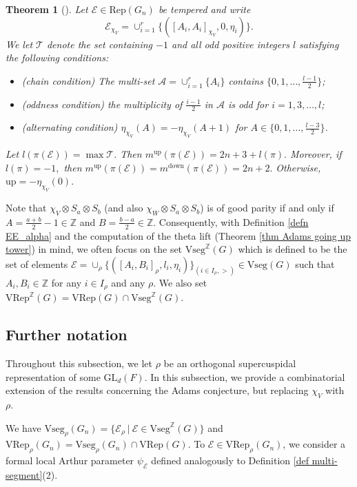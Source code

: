 \documentclass[11pt,letterpaper]{amsart}
\newcommand{\Z}{\mathbb{Z}}
\newcommand{\Vseg}{{\mathrm{Vseg}}}
\newcommand{\Rep}{{\mathrm{Rep}}}
\newcommand{\VRep}{{\mathrm{VRep}}}
\newcommand{\up}{{\mathrm{up}}}
\newcommand{\down}{{\mathrm{down}}}
\newcommand{\GL}{\mathrm{GL}}
\newcommand{\EE}{\mathcal{E}}
\newtheorem{thm}{Theorem}[section]
\numberwithin{equation}{section}
\begin{document}
\begin{thm}[{\cite[Theorem 4.1]{AG17a}}]\label{thm going up first occurrence}
    Let $\EE\in\Rep(G_n)$ be tempered and write
    \[
    \EE_{\chi_V}=\cup_{i=1}^r\{([A_i,A_i]_{\chi_V},0,\eta_i)\}.
    \]
    We let $\mathcal{T}$ denote the set containing $-1$ and all odd positive integers $l$ satisfying the following conditions:
    \begin{itemize}
        \item (chain condition) The multi-set $\mathcal{A}=\cup_{i=1}^r\{A_i\}$ contains $\{0,1,\dots,\frac{l-1}{2}\}$;
        \item (oddness condition) the multiplicity of $\frac{i-1}{2}$ in $\mathcal{A}$ is odd for $i=1,3,\dots,l$;
        \item (alternating condition) $\eta_{\chi_V}(A)=-\eta_{\chi_V}(A+1)$ for $A\in\{0,1,\dots,\frac{l-3}{2}\}$.
    \end{itemize}
    Let $l(\pi(\EE))=\max\mathcal{T}.$
    Then $m^{\up}(\pi(\EE))=2n+3+l(\pi).$ Moreover, if $l(\pi)=-1,$ then $m^{\up}(\pi(\EE))=m^{\down}(\pi(\EE))=2n+2.$ Otherwise, $\up=-\eta_{\chi_V}(0).$
\end{thm}


Note that $\chi_V\otimes S_a\otimes S_b$ (and also $\chi_W\otimes S_a\otimes S_b$) is of good parity if and only if $A=\frac{a+b}{2}-1\in\Z$ and $B=\frac{b-a}{2}\in\Z.$ Consequently, with Definition \ref{defn EE_alpha} and the computation of the theta lift (Theorem \ref{thm Adams going up tower}) in mind, we often focus on the set $\Vseg^\Z(G)$ which is defined to be the set of elements $\EE=\cup_\rho\{([A_i,B_i]_\rho,l_i,\eta_i)\}_{(i\in I_\rho, >)}\in\Vseg(G)$ such that $A_i,B_i\in\Z$ for any $i\in I_\rho$ and any $\rho.$ We also set $\VRep^\Z(G)=\VRep(G)\cap\Vseg^\Z(G)$. 

\subsection{Further notation}\label{sec combinatorial nonsense}

Throughout this subsection, we let $\rho$ be an orthogonal supercuspidal representation of some $\GL_d(F)$. In this subsection, we provide a combinatorial extension of the results concerning the Adams conjecture, but replacing $\chi_V$ with $\rho.$


We have $\Vseg_\rho(G_n)=\{\EE_\rho \ | \ \EE\in\Vseg^\Z(G)\}$ and $\VRep_\rho(G_n)=\Vseg_\rho(G_n)\cap\VRep(G).$ To $\EE\in\VRep_\rho(G_n)$, we consider a formal local Arthur parameter $\psi_\EE$ defined analogously to Definition \ref{def multi-segment}(2).
\end{document}
